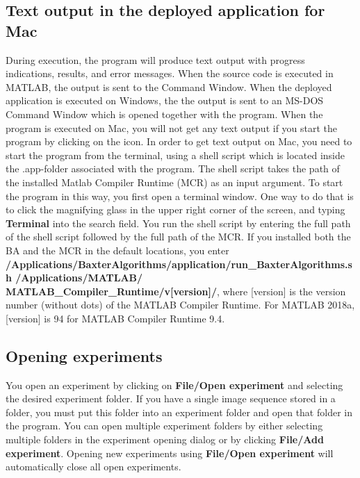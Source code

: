 \documentclass[a4paper, oneside, onecolumn, 11pt]{article}
\newcommand{\menu}[1]{\textbf{#1}}
\newcommand{\command}[1]{\textbf{#1}}
\begin{document}
\subsection{Text output in the deployed application for Mac}
\label{sec:mac-terminal}
During execution, the program will produce text output with progress indications, results, and error messages. When the source code is executed in MATLAB, the output is sent to the Command Window. When the deployed application is executed on Windows, the the output is sent to an MS-DOS Command Window which is opened together with the program. When the program is executed on Mac, you will not get any text output if you start the program by clicking on the icon. In order to get text output on Mac, you need to start the program from the terminal, using a shell script which is located inside the .app-folder associated with the program. The shell script takes the path of the installed Matlab Compiler Runtime (MCR) as an input argument. To start the program in this way, you first open a terminal window. One way to do that is to click the magnifying glass in the upper right corner of the screen, and typing \command{Terminal} into the search field. You run the shell script by entering the full path of the shell script followed by the full path of the MCR. If you installed both the BA and the MCR in the default locations, you enter \command{/\mbox{Applications}/\allowbreak BaxterAlgorithms/\allowbreak \mbox{application}/\allowbreak run\_BaxterAlgorithms.sh \allowbreak/\mbox{Applications}/\allowbreak MATLAB/\allowbreak\\ MATLAB\_Compiler\_Runtime/\allowbreak v[version]/}, where [version] is the version number (without dots) of the MATLAB Compiler Runtime. For MATLAB 2018a, [version] is 94 for MATLAB Compiler Runtime 9.4.

\subsection{Opening experiments}
You open an experiment by clicking on \menu{File/\allowbreak Open experiment} and selecting the desired experiment folder. If you have a single image sequence stored in a folder, you must put this folder into an experiment folder and open that folder in the program. You can open multiple experiment folders by either selecting multiple folders in the experiment opening dialog or by clicking \menu{File/\allowbreak Add experiment}. Opening new experiments using \menu{File/\allowbreak Open experiment} will automatically close all open experiments.
\end{document}
